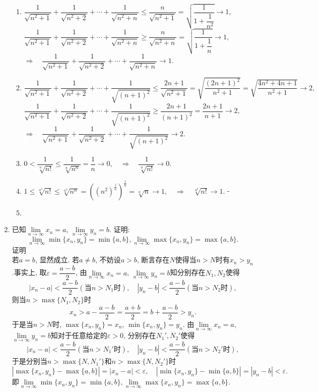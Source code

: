 \documentclass[UTF8,a4paper,20pt]{article}
\begin{document}
\begin{enumerate}
\begin{enumerate}[(1)]
	\item $\dfrac{1}{\sqrt{n^2+1}}+\dfrac{1}{\sqrt{n^2+2}}+\cdots+\dfrac{1}{\sqrt{n^2+n}}\leqslant\dfrac{n}{\sqrt{n^2+1}}=\sqrt{\dfrac{1}{1+\dfrac{1}{n^2}}}\to 1,$\\
		  $\dfrac{1}{\sqrt{n^2+1}}+\dfrac{1}{\sqrt{n^2+2}}+\cdots+\dfrac{1}{\sqrt{n^2+n}}\geqslant\dfrac{n}{\sqrt{n^2+n}}=\sqrt{\dfrac{1}{1+\dfrac{1}{n}}}\to 1,$\\
		  $\Rightarrow\quad \dfrac{1}{\sqrt{n^2+1}}+\dfrac{1}{\sqrt{n^2+2}}+\cdots+\dfrac{1}{\sqrt{n^2+n}}\to 1.$
	\item $\dfrac{1}{\sqrt{n^2+1}}+\dfrac{1}{\sqrt{n^2+2}}+\cdots+\dfrac{1}{\sqrt{(n+1)^2}}\leqslant\dfrac{2n+1}{\sqrt{n^2+1}}=\sqrt{\dfrac{(2n+1)^2}{n^2+1}}=\sqrt{\dfrac{4n^2+4n+1}{n^2+1}}\to2,$\\
		  $\dfrac{1}{\sqrt{n^2+1}}+\dfrac{1}{\sqrt{n^2+2}}+\cdots+\dfrac{1}{\sqrt{(n+1)^2}}\geqslant\dfrac{2n+1}{(n+1)^2}=\dfrac{2n+1}{n+1}\to 2,$\\
		  $\Rightarrow\quad \dfrac{1}{\sqrt{n^2+1}}+\dfrac{1}{\sqrt{n^2+2}}+\cdots+\dfrac{1}{\sqrt{(n+1)^2}}\to 2.$
	\item $0<\dfrac{1}{\sqrt[n]{n!}}\leqslant\dfrac{1}{\sqrt[n]{n^n}}=\dfrac{1}{n}\to 0, \quad\Rightarrow\quad \dfrac{1}{\sqrt[n]{n!}}\to 0.$
	\item $1\leqslant\sqrt[n^2]{n!}\leqslant\sqrt[n^2]{n^n}=((n^2)^{\frac{1}{n}})^{\frac{1}{n}}=\sqrt[n]{n}\to 1,\quad\Rightarrow\quad \sqrt[n^2]{n!}\to 1.$   -
	\item 
	\end{enumerate}

\item 已知$\lim\limits_{n\to\infty}x_n=a$, $\lim\limits_{n\to\infty}y_n=b$. 证明:
\[ \lim\limits_{n\to\infty}\min\{x_n,y_n\}=\min\{a,b\}, \lim\limits_{n\to\infty}\max\{x_n,y_n\}=\max\{a,b\}. \]
{\heiti 证明}\\
若$a=b$, 显然成立. 若$a\neq b$, 不妨设$a>b$, 断言存在$N$使得当$n>N$时有$x_n>y_n$.事实上, 取$\varepsilon=\dfrac{a-b}{2}$, 由$\lim\limits_{n\to\infty}x_n=a$, $\lim\limits_{n\to\infty}y_n=b$知分别存在$N_1,N_2$使得
\[|x_n-a|<\dfrac{a-b}{2}(\text{当$n>N_1$时}),\quad |y_n-b|<\dfrac{a-b}{2}(\text{当$n>N_2$时}),\]
则当$n>\max\{N_1,N_2\}$时
\[x_n>a-\dfrac{a-b}{2}=\dfrac{a+b}{2}=b+\dfrac{a-b}{2}>y_n.\]
于是当$n>N$时, $\max\{x_n, y_n\}=x_n$, $\min\{x_n, y_n\}=y_n$. 由$\lim\limits_{n\to\infty}x_n=a$, $\lim\limits_{n\to\infty}y_n=b$知对于任意给定的$\varepsilon>0$, 分别存在$N_1',N_2'$使得
\[|x_n-a|<\dfrac{a-b}{2}(\text{当$n>N_1'$时}),\quad |y_n-b|<\dfrac{a-b}{2}(\text{当$n>N_2'$时}),\]
于是分别当$n>\max\{N,N_1'\}$和$n>\max\{N,N_2'\}$时
\[ \left|\max\{x_n,y_n\}-\max\{a,b\}\right|=|x_n-a|<\varepsilon, \quad \left|\min\{x_n,y_n\}-\min\{a,b\}\right|=|y_n-b|<\varepsilon.\]
即$\lim\limits_{n\to\infty}\min\{x_n,y_n\}=\min\{a,b\}, \lim\limits_{n\to\infty}\max\{x_n,y_n\}=\max\{a,b\}.$


\end{enumerate}
\end{document}
